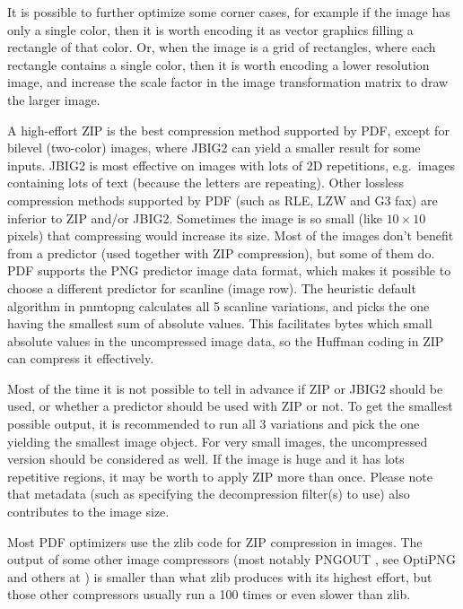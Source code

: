 \documentclass{ltugproc}
\def\cmd{\textsf}
\def\pkg{\textsf}
\begin{document}
It is possible to further optimize some corner cases, for example if the
image has only a single color, then it is worth encoding it as vector
graphics filling a rectangle of that color. Or, when the image is a grid of
rectangles, where each rectangle contains a single color, then it is worth
encoding a lower resolution image, and increase the scale factor in the
image transformation matrix to draw the larger image.

A high-effort ZIP is the best compression method supported by PDF, except
for bilevel (two-color) images, where JBIG2 can yield a smaller result for
some inputs. JBIG2 is most effective on images with lots of 2D repetitions,
e.g.\ images containing lots of text (because the letters are repeating).
Other lossless compression methods supported by PDF (such as RLE, LZW and G3
fax) are inferior to ZIP and/or JBIG2. Sometimes the image is so small (like
$10\times10$ pixels) that compressing would increase its size.
Most of the images don't benefit from a predictor (used
together with ZIP compression), but some of them do. PDF supports the PNG
predictor image data format, which makes it possible to choose a different
predictor for scanline (image row). The heuristic default algorithm in
\cmd{pnmtopng} calculates all 5 scanline variations, and picks the one
having the smallest sum of absolute values. This facilitates bytes which
small absolute values in the uncompressed image data, so the Huffman coding
in ZIP can compress it effectively.

Most of the time it is not possible to tell in advance if ZIP or JBIG2
should be used, or whether a predictor should be used with ZIP or not. To
get the smallest possible output, it is recommended to run all 3 variations
and pick the one yielding the smallest image object. For very small images,
the uncompressed version should be considered as well. If the image is huge
and it has lots repetitive regions, it may be worth to apply ZIP more than
once. Please note that metadata (such as specifying the decompression
filter(s) to use) also contributes to the image size.

Most PDF optimizers use the \pkg{zlib} code for ZIP compression in images.
The output of some other image compressors (most notably PNGOUT
\cite{pngout}, see OptiPNG \cite{optipng} and others at \cite{png-recompressors})
is smaller than what \pkg{zlib} produces with its highest effort, but those
other compressors usually run a 100 times or even slower than \pkg{zlib}.
\end{document}
